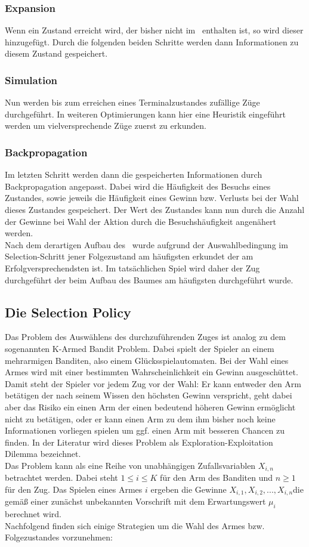\subsubsection{Expansion}
Wenn ein Zustand erreicht wird, der bisher nicht im \gtree\ enthalten ist, so wird dieser hinzugefügt. Durch die folgenden beiden Schritte werden dann Informationen zu diesem Zustand gespeichert.
\subsubsection{Simulation}
Nun werden bis zum erreichen eines Terminalzustandes zufällige Züge durchgeführt. In weiteren Optimierungen kann hier eine Heuristik eingeführt werden um vielversprechende Züge zuerst zu erkunden.
\subsubsection{Backpropagation}
Im letzten Schritt werden dann die gespeicherten Informationen durch Backpropagation angepasst. Dabei wird die Häufigkeit des Besuchs eines Zustandes, sowie jeweils die Häufigkeit eines Gewinn bzw. Verlusts bei der Wahl dieses Zustandes gespeichert. Der Wert des Zustandes kann nun durch die Anzahl der Gewinne bei Wahl der Aktion durch die Besuchshäufigkeit angenähert werden.\\
Nach dem derartigen Aufbau des \gtrees\ wurde aufgrund der Auswahlbedingung im Selection-Schritt jener Folgezustand am häufigsten erkundet der am Erfolgversprechendsten ist. Im tatsächlichen Spiel wird daher der Zug durchgeführt der beim Aufbau des Baumes am häufigsten durchgeführt wurde.
\subsection{Die Selection Policy}
\label{Chapter.SelectionPolicy}
Das Problem des Auswählens des durchzuführenden Zuges ist analog zu dem sogenannten K-Armed Bandit Problem. Dabei spielt der Spieler an einem mehrarmigen Banditen, also einem Glücksspielautomaten. Bei der Wahl eines Armes wird mit einer bestimmten Wahrscheinlichkeit ein Gewinn ausgeschüttet. Damit steht der Spieler vor jedem Zug vor der Wahl: Er kann entweder den Arm betätigen der nach seinem Wissen den höchsten Gewinn verspricht, geht dabei aber das Risiko ein einen Arm der einen bedeutend höheren Gewinn ermöglicht nicht zu betätigen, oder er kann einen Arm zu dem ihm bisher noch keine Informationen vorliegen spielen um ggf. einen Arm mit besseren Chancen zu finden. In der Literatur wird dieses Problem als Exploration-Exploitation Dilemma bezeichnet.\\
Das Problem kann als eine Reihe von unabhängigen Zufallsvariablen \(X_{ i, n }\) betrachtet werden. Dabei steht \( 1 \leq i \leq K\) für den Arm des Banditen und \(n \geq 1 \) für den Zug. Das Spielen eines Armes \(i\) ergeben die Gewinne \(X_{ i, 1}, X_{ i, 2}, ..., X_{i, n}\)die gemäß einer zunächst unbekannten Vorschrift mit dem Erwartungswert \(\mu_{i}\) berechnet wird. \cite{browne2012survey}\\
Nachfolgend finden sich einige Strategien um die Wahl des Armes bzw. Folgezustandes vorzunehmen:
